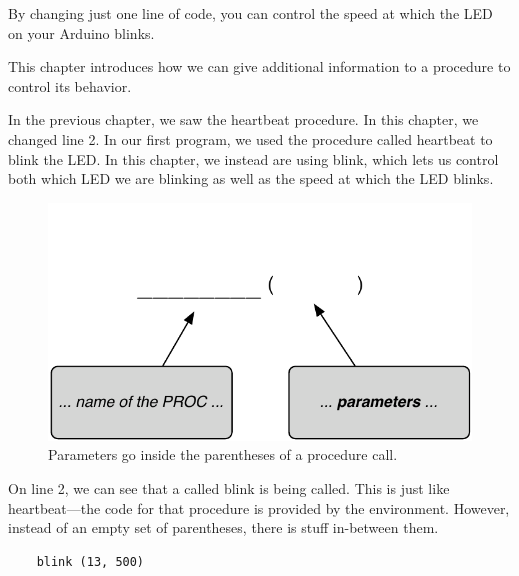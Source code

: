 
By changing just one line of code, you can control the speed at which the LED on your Arduino blinks.

\GOALS
This chapter introduces how we can give additional information to a procedure to control its behavior. 

\CODE



\PATTERNS
In the previous chapter, we saw the {\procname heartbeat} procedure. In this chapter, we changed line 2. In our first program, we used the \plumbing procedure called {\procname heartbeat} to blink the LED. In this chapter, we instead are using {\procname blink}, which lets us control both which LED we are blinking as well as the speed at which the LED blinks.

\begin{figure}[h]
  \begin{center}
    \includegraphics[width=\linewidth]{images/parameter-pattern}
    \caption{Parameters go inside the parentheses of a procedure call.}
    \label{pattern:parameters}
  \end{center}
\end{figure}

On line 2, we can see that a \PROCedure called {\procname blink} is being called. This is just like {\procname heartbeat}---the code for that procedure is provided by the \plumbing environment. However, instead of an empty set of parentheses, there is stuff in-between them. 

\begin{verbatim}
	blink (13, 500)
\end{verbatim}

